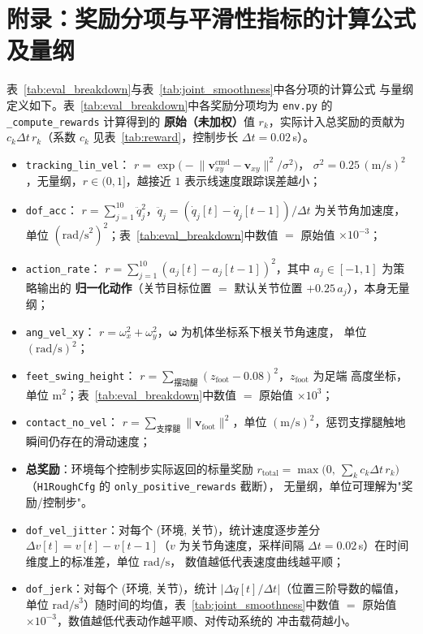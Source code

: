 \documentclass[12pt, a4paper]{article}
\begin{document}
\newpage
\section*{附录：奖励分项与平滑性指标的计算公式及量纲}

表~\ref{tab:eval_breakdown}与表~\ref{tab:joint_smoothness}中各分项的计算公式
与量纲定义如下。表~\ref{tab:eval_breakdown}中各奖励分项均为
\texttt{env.py} 的 \texttt{\_compute\_rewards} 计算得到的
\textbf{原始（未加权）}值 $r_k$，实际计入总奖励的贡献为
$c_k \Delta t\, r_k$（系数 $c_k$ 见表~\ref{tab:reward}，控制步长
$\Delta t = 0.02$\,s）。

\begin{itemize}
    \item \texttt{tracking\_lin\_vel}：
          $r=\exp\!\big(-\lVert \mathbf{v}_{xy}^{\text{cmd}}-\mathbf{v}_{xy}\rVert^2/\sigma^2\big)$，
          $\sigma^2=0.25\,(\text{m/s})^2$，无量纲，$r\in(0,1]$，越接近 $1$ 表示线速度跟踪误差越小；
    \item \texttt{dof\_acc}：
          $r=\sum_{j=1}^{10}\ddot{q}_j^2$，$\ddot{q}_j=(\dot{q}_j[t]-\dot{q}_j[t-1])/\Delta t$
          为关节角加速度，单位 $(\text{rad/s}^2)^2$；表~\ref{tab:eval_breakdown}中数值
          $=$ 原始值 $\times 10^{-3}$；
    \item \texttt{action\_rate}：
          $r=\sum_{j=1}^{10}(a_j[t]-a_j[t-1])^2$，其中 $a_j\in[-1,1]$ 为策略输出的
          \textbf{归一化动作}（关节目标位置 $=$ 默认关节位置 $+0.25\,a_j$），本身无量纲；
    \item \texttt{ang\_vel\_xy}：
          $r=\omega_x^2+\omega_y^2$，$\boldsymbol\omega$ 为机体坐标系下根关节角速度，
          单位 $(\text{rad/s})^2$；
    \item \texttt{feet\_swing\_height}：
          $r=\sum_{\text{摆动腿}}(z_{\text{foot}}-0.08)^2$，$z_{\text{foot}}$ 为足端
          高度坐标，单位 $\text{m}^2$；表~\ref{tab:eval_breakdown}中数值
          $=$ 原始值 $\times 10^{3}$；
    \item \texttt{contact\_no\_vel}：
          $r=\sum_{\text{支撑腿}}\lVert\mathbf{v}_{\text{foot}}\rVert^2$，单位
          $(\text{m/s})^2$，惩罚支撑腿触地瞬间仍存在的滑动速度；
    \item \textbf{总奖励}：环境每个控制步实际返回的标量奖励
          $r_{\text{total}}=\max\big(0,\ \sum_k c_k\Delta t\,r_k\big)$
          （\texttt{H1RoughCfg} 的 \texttt{only\_positive\_rewards} 截断），
          无量纲，单位可理解为"奖励/控制步"。
    \item \texttt{dof\_vel\_jitter}：对每个 (环境, 关节)，统计速度逐步差分
          $\Delta v[t]=v[t]-v[t-1]$（$v$ 为关节角速度，采样间隔
          $\Delta t=0.02$\,s）在时间维度上的标准差，单位 $\text{rad/s}$，
          数值越低代表速度曲线越平顺；
    \item \texttt{dof\_jerk}：对每个 (环境, 关节)，统计
          $\left|\Delta\ddot{q}[t]/\Delta t\right|$（位置三阶导数的幅值，
          单位 $\text{rad/s}^3$）随时间的均值，表~\ref{tab:joint_smoothness}中数值
          $=$ 原始值 $\times 10^{-3}$，数值越低代表动作越平顺、对传动系统的
          冲击载荷越小。
\end{itemize}
\end{document}
